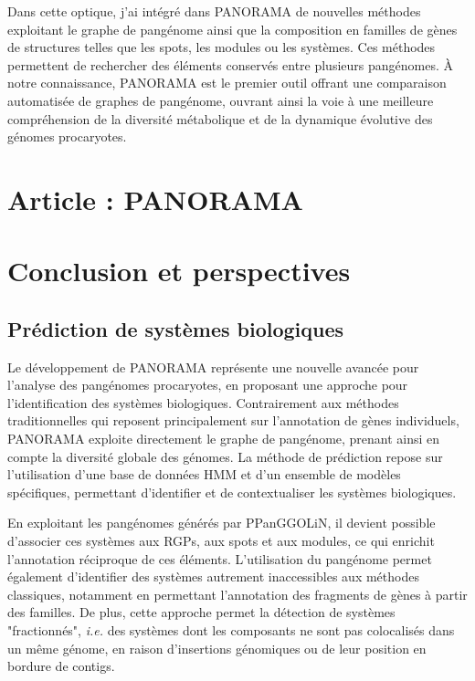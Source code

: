 Dans cette optique, j’ai intégré dans PANORAMA de nouvelles méthodes exploitant le graphe de pangénome ainsi que la composition en familles de gènes de structures telles que les spots, les modules ou les systèmes. Ces méthodes permettent de rechercher des éléments conservés entre plusieurs pangénomes. À notre connaissance, PANORAMA est le premier outil offrant une comparaison automatisée de graphes de pangénome, ouvrant ainsi la voie à une meilleure compréhension de la diversité métabolique et de la dynamique évolutive des génomes procaryotes.

\chapter{Article : PANORAMA}



\chapter{Conclusion et perspectives}

\section{Prédiction de systèmes biologiques}

Le développement de PANORAMA représente une nouvelle avancée pour l'analyse des pangénomes procaryotes, en proposant une approche pour l'identification des systèmes biologiques. Contrairement aux méthodes traditionnelles qui reposent principalement sur l’annotation de gènes individuels, PANORAMA exploite directement le graphe de pangénome, prenant ainsi en compte la diversité globale des génomes. La méthode de prédiction repose sur l'utilisation d’une base de données HMM et d’un ensemble de modèles spécifiques, permettant d’identifier et de contextualiser les systèmes biologiques.

En exploitant les pangénomes générés par PPanGGOLiN, il devient possible d’associer ces systèmes aux RGPs, aux spots et aux modules, ce qui enrichit l’annotation réciproque de ces éléments. L’utilisation du pangénome permet également d’identifier des systèmes autrement inaccessibles aux méthodes classiques, notamment en permettant l’annotation des fragments de gènes à partir des familles. De plus, cette approche permet la détection de systèmes "fractionnés", \textit{i.e.} des systèmes dont les composants ne sont pas colocalisés dans un même génome, en raison d’insertions génomiques ou de leur position en bordure de contigs.

